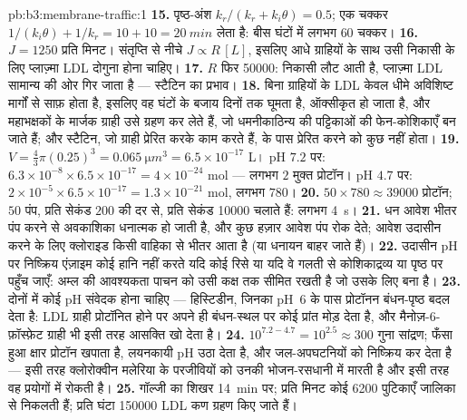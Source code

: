 \begin{solution}{pb:b3:membrane-traffic:1}
\textbf{15.} पृष्ठ-अंश $k_{r}/(k_{r} + k_{i}\theta) = 0.5$; एक
चक्कर $1/(k_{i}\theta) + 1/k_{r} = 10 + 10 = \qty{20}{min}$ लेता है:
बीस घंटों में लगभग $60$ चक्कर।
\textbf{16.} $J = 1250$ प्रति मिनट। संतृप्ति से नीचे $J \propto R\,[L]$,
इसलिए आधे ग्राहियों के साथ उसी निकासी के लिए प्लाज़्मा LDL दोगुना होना चाहिए।
\textbf{17.} $R$ फिर \num{50000}: निकासी लौट आती है, प्लाज़्मा LDL
सामान्य की ओर गिर जाता है --- स्टैटिन का प्रभाव।
\textbf{18.} बिना ग्राहियों के LDL केवल धीमे अविशिष्ट मार्गों से साफ़
होता है, इसलिए वह घंटों के बजाय दिनों तक घूमता है, ऑक्सीकृत हो जाता है,
और महाभक्षकों के मार्जक ग्राही उसे ग्रहण कर लेते हैं, जो धमनीकाठिन्य
की पट्टिकाओं की फेन-कोशिकाएँ बन जाते हैं; और स्टैटिन, जो ग्राही
प्रेरित करके काम करते हैं, के पास प्रेरित करने को कुछ नहीं होता।
\textbf{19.} $V = \tfrac{4}{3}\pi(0.25)^{3} = \qty{0.065}{\micro m^3} =
6.5\times 10^{-17}$ L। pH $7.2$ पर: $6.3\times 10^{-8}\times 6.5\times
10^{-17} = 4\times 10^{-24}$ mol --- लगभग $2$ मुक्त प्रोटॉन। pH $4.7$ पर:
$2\times 10^{-5}\times 6.5\times 10^{-17} = 1.3\times 10^{-21}$ mol,
लगभग $780$।
\textbf{20.} $50\times 780 \approx \num{39000}$ प्रोटॉन; $50$ पंप,
प्रति सेकंड $200$ की दर से, प्रति सेकंड \num{10000} चलाते हैं: लगभग \qty{4}{s}।
\textbf{21.} धन आवेश भीतर पंप करने से अवकाशिका धनात्मक हो जाती है, और
कुछ हज़ार आवेश पंप रोक देते; आवेश उदासीन करने के लिए क्लोराइड किसी
वाहिका से भीतर आता है (या धनायन बाहर जाते हैं)।
\textbf{22.} उदासीन pH पर निष्क्रिय एंज़ाइम कोई हानि नहीं करते यदि कोई
 रिसे या यदि वे गलती से कोशिकाद्रव्य या पृष्ठ पर पहुँच जाएँ:
अम्ल की आवश्यकता पाचन को उसी कक्ष तक सीमित रखती है जो उसके लिए बना है।
\textbf{23.} दोनों में कोई pH संवेदक होना चाहिए --- हिस्टिडीन, जिनका
pH~6 के पास प्रोटॉनन बंधन-पृष्ठ बदल देता है: LDL ग्राही प्रोटॉनित होने
पर अपने ही बंधन-स्थल पर कोई प्रांत मोड़ देता है, और
मैनोज़-6-फ़ॉस्फ़ेट ग्राही भी इसी तरह आसक्ति खो देता है।
\textbf{24.} $10^{7.2 - 4.7} = 10^{2.5} \approx 300$ गुना सांद्रण;
फँसा हुआ क्षार प्रोटॉन खपाता है, लयनकायी pH उठा देता है, और
जल-अपघटनियों को निष्क्रिय कर देता है --- इसी तरह क्लोरोक्वीन मलेरिया
के परजीवियों को उनकी भोजन-रसधानी में मारती है और इसी तरह वह प्रयोगों
में  रोकती है।
\textbf{25.} गॉल्जी का शिखर \qty{14}{min} पर; प्रति मिनट कोई \num{6200}
पुटिकाएँ जालिका से निकलती हैं; प्रति घंटा \num{150000} LDL कण ग्रहण
किए जाते हैं।
\end{solution}
